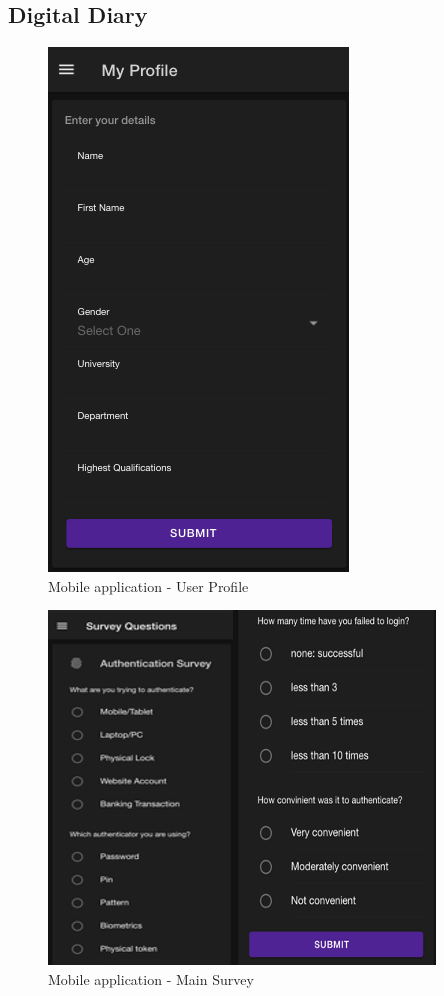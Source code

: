 \subsection{Digital Diary}
\begin{figure}
\begin{center}
  \includegraphics[scale=0.5]{images/profile.png}
\end{center}
\caption{\label{fig:app-profile} Mobile application - User Profile}
\end{figure}
\begin{figure}
\begin{center}
  \includegraphics[scale=0.5]{images/main-survey-1.png}
\end{center}
\caption{\label{fig:app-main-survey} Mobile application - Main Survey}
\end{figure}
